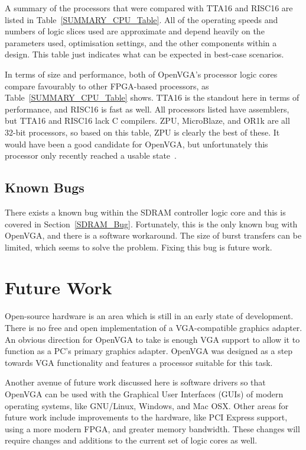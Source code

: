A summary of the processors that were compared with TTA16 and RISC16 are listed
in Table~\ref{SUMMARY_CPU_Table}. All of the operating speeds and numbers of
logic slices used are approximate and depend heavily on the parameters used,
optimisation settings, and the other components within a design. This table just
indicates what can be expected in best-case scenarios.

In terms of size and performance, both of OpenVGA's processor logic cores compare
favourably to other FPGA-based processors, as Table~\ref{SUMMARY_CPU_Table}
shows. TTA16 is the standout here in terms of performance, and RISC16 is fast as
well. All processors listed have assemblers, but TTA16 and RISC16 lack C
compilers. ZPU, MicroBlaze, and OR1k are all 32-bit processors, so based on this
table, ZPU is clearly the best of these. It would have been a good candidate for
OpenVGA, but unfortunately this processor only recently reached a usable
state~\cite{ZPU}.


\subsection{Known Bugs}
There exists a known bug within the SDRAM controller logic core and this is
covered in Section~\ref{SDRAM_Bug}. Fortunately, this is the only known bug with
OpenVGA, and there is a software workaround. The size of burst transfers can be
limited, which seems to solve the problem. Fixing this bug is future work.


\section{Future Work}
Open-source hardware is an area which is still in an early state of development.
There is no free and open implementation of a VGA-compatible graphics adapter. An
obvious direction for OpenVGA to take is enough VGA support to allow it to
function as a PC's primary graphics adapter. OpenVGA was designed as a step
towards VGA functionality and features a processor suitable for this task.

Another avenue of future work discussed here is software drivers so that OpenVGA
can be used with the Graphical User Interfaces (GUIs) of modern operating
systems, like GNU/Linux, Windows, and Mac OSX. Other areas for future work
include improvements to the hardware, like PCI Express support, using a more
modern FPGA, and greater memory bandwidth. These changes will require changes and
additions to the current set of logic cores as well.


